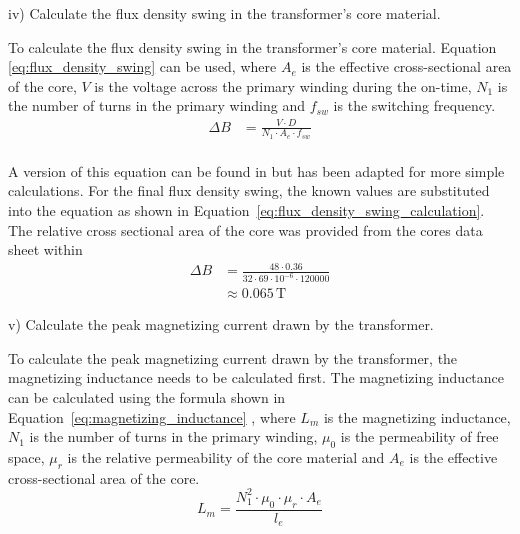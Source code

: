 \documentclass[a4paper, 12pt, titlepage]{report}
\begin{document}
iv) Calculate the flux density swing in the transformer's core material.

To calculate the flux density swing in the transformer's core material. Equation \ref{eq:flux_density_swing} can be used, where \(A_e\) is the effective cross-sectional area of the core, \(V\) is the voltage across the primary winding during the on-time, \(N_1\) is the number of turns in the primary winding and \(f_{sw}\) is the switching frequency.
\begin{equation}
    \begin{split}
        \varDelta B &= \frac{V \cdot D}{N_1 \cdot A_e \cdot f_{sw}} \\
    \end{split}
    \label{eq:flux_density_swing}
\end{equation}

A version of this equation can be found in \cite{FundamentalsOfPowerElectronics} but has been adapted for more simple calculations. For the final flux density swing, the known values are substituted into the equation as shown in Equation~\ref{eq:flux_density_swing_calculation}. The relative cross sectional area of the core was provided from the cores data sheet within \cite{EE466CourseworkPart2}
\begin{equation}
    \begin{split}
        \varDelta B &= \frac{48 \cdot 0.36}{32 \cdot 69\cdot 10^{-6} \cdot 120000} \\
        &\approx 0.065\,\mathrm{T}
    \end{split}
    \label{eq:flux_density_swing_calculation}
\end{equation}

v) Calculate the peak magnetizing current drawn by the transformer.

To calculate the peak magnetizing current drawn by the transformer, the magnetizing inductance needs to be calculated first. The magnetizing inductance can be calculated using the formula shown in Equation~\ref{eq:magnetizing_inductance} \cite{FundamentalsOfPowerElectronics}, where \(L_m\) is the magnetizing inductance, \(N_1\) is the number of turns in the primary winding, \(\mu_0\) is the permeability of free space, \(\mu_r\) is the relative permeability of the core material and \(A_e\) is the effective cross-sectional area of the core.
\begin{equation}
    L_m = \frac{N_1^2 \cdot \mu_0 \cdot \mu_r \cdot A_e}{l_e}
    \label{eq:magnetizing_inductance}
\end{equation}
\end{document}
